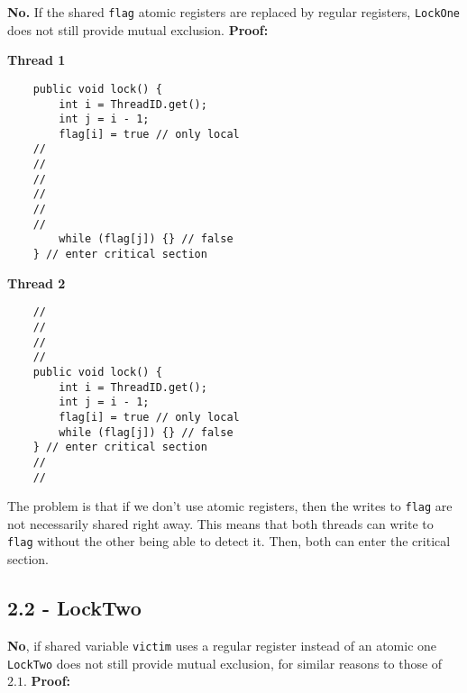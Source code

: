 \documentclass[11pt, letterpaper]{article}
\newcommand{\code}[1] { \texttt{#1} }
\begin{document}
\textbf{No.} If the shared \code{flag} atomic registers are replaced by regular registers, \code{LockOne} does not still provide mutual exclusion. \textbf{Proof:}

\begin{figure*}[h!]
    \begin{minipage}{0.5\textwidth}
        \centering
        \textbf{Thread 1}
        \begin{verbatim}
    public void lock() {
        int i = ThreadID.get();
        int j = i - 1;
        flag[i] = true // only local
    //
    //
    //
    //
    //
    //
        while (flag[j]) {} // false
    } // enter critical section
        \end{verbatim}
    \end{minipage}
    \hspace{.5cm}
    \begin{minipage}{0.5\textwidth}
        \centering
        \textbf{Thread 2}
        \begin{verbatim}
    //
    //
    //
    //
    public void lock() {
        int i = ThreadID.get();
        int j = i - 1;
        flag[i] = true // only local
        while (flag[j]) {} // false
    } // enter critical section
    //
    //
        \end{verbatim}
    \end{minipage}
\end{figure*}

The problem is that if we don't use atomic registers, then the writes to \code{flag} are not necessarily shared right away. This means that both threads can write to \code{flag} without the other being able to detect it. Then, both can enter the critical section.

\subsection*{2.2 - LockTwo}
\label{sub:2_2_locktwo}

\textbf{No}, if shared variable \code{victim} uses a regular register instead of an atomic one \code{LockTwo} does not still provide mutual exclusion, for similar reasons to those of $2.1$. \textbf{Proof:}
\end{document}
